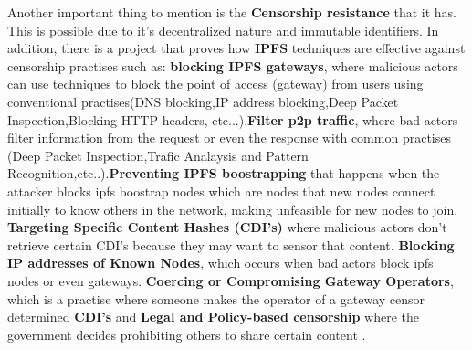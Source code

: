 Another important thing to mention is the \textbf{Censorship resistance} that it has. This is possible due to it's decentralized nature and immutable identifiers. In addition, there is a project that proves how \textbf{IPFS} techniques are effective against censorship practises such as: \textbf{blocking IPFS gateways}, where malicious actors can use techniques to block the point of access (gateway) from users using conventional practises(DNS blocking,IP address blocking,Deep Packet Inspection,Blocking HTTP headers, etc...).\textbf{Filter p2p traffic}, where bad actors filter information from the request or even the response with common practises (Deep Packet Inspection,Trafic Analaysis and Pattern Recognition,etc..).\textbf{Preventing IPFS boostrapping} that happens when the attacker blocks ipfs boostrap nodes which are nodes that new nodes connect initially to know others in the network, making unfeasible for new nodes to join. \textbf{Targeting Specific Content Hashes (CDI's)} where malicious actors don't retrieve certain CDI's because they may want to sensor that content. \textbf{Blocking IP addresses of Known Nodes}, which occurs when bad actors block ipfs nodes or even gateways. \textbf{Coercing or Compromising Gateway Operators}, which is a practise where someone makes the operator of a gateway censor determined \textbf{CDI's} and \textbf{Legal and Policy-based censorship} where the government decides prohibiting others to share certain content \cite{censhorship-combat}.

